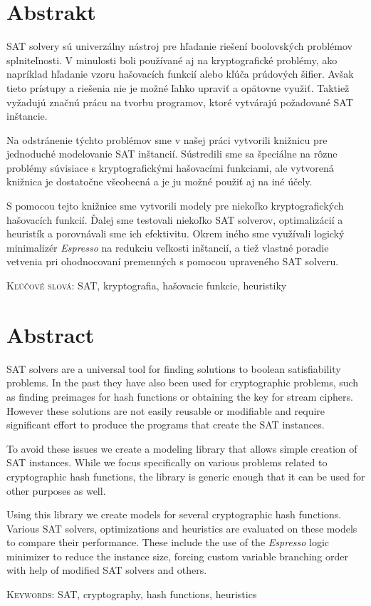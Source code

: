 \chapter*{Abstrakt}
SAT solvery sú univerzálny nástroj pre hľadanie riešení boolovských problémov spl\-ni\-teľ\-no\-sti.
V minulosti boli používané aj na kryptografické problémy, ako napríklad hľadanie vzoru hašovacích funkcií alebo kľúča prúdových šifier.
Avšak tieto prístupy a riešenia nie je možné ľahko upraviť a opätovne využiť.
Taktiež vyžadujú značnú prácu na tvorbu programov, ktoré vytvárajú požadované SAT inštancie.

Na odstránenie týchto problémov sme v našej práci vytvorili knižnicu pre jednoduché modelovanie SAT inštancií.
Sústredili sme sa špeciálne na rôzne problémy súvisiace s kryptografickými hašovacími funkciami, ale vytvorená knižnica je dostatočne všeobecná a je ju možné použiť aj na iné účely.

S pomocou tejto knižnice sme vytvorili modely pre niekoľko kryptografických hašovacích funkcií.
Ďalej sme testovali niekoľko SAT solverov, optimalizácií a heuristík a porovnávali sme ich efektivitu.
Okrem iného sme využívali logický minimalizér \emph{Espresso} na redukciu veľkosti inštancií, a tiež vlastné poradie vetvenia pri ohodnocovaní premenných s pomocou upraveného SAT solveru.

\vspace{2cm}
\noindent\textsc{Kľúčové slová:} SAT, kryptografia, hašovacie funkcie, heuristiky

\chapter*{Abstract}
SAT solvers are a universal tool for finding solutions to boolean satisfiability problems.
In the past they have also been used for cryptographic problems, such as finding preimages for hash functions or obtaining the key for stream ciphers.
However these solutions are not easily reusable or modifiable and require significant effort to produce the programs that create the SAT instances.

To avoid these issues we create a modeling library that allows simple creation of SAT instances.
While we focus specifically on various problems related to cryptographic hash functions, the library is generic enough that it can be used for other purposes as well.

Using this library we create models for several cryptographic hash functions.
Various SAT solvers, optimizations and heuristics are evaluated on these models to compare their performance.
These include the use of the \emph{Espresso} logic minimizer to reduce the instance size, forcing custom variable branching order with help of modified SAT solvers and others.

\vspace{2cm}
\noindent\textsc{Keywords:} SAT, cryptography, hash functions, heuristics